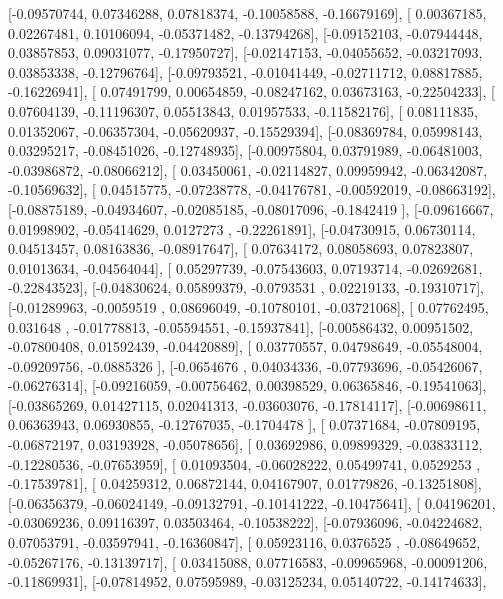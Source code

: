 \documentclass{article}
\begin{document}
       [-0.09570744,  0.07346288,  0.07818374, -0.10058588, -0.16679169],
       [ 0.00367185,  0.02267481,  0.10106094, -0.05371482, -0.13794268],
       [-0.09152103, -0.07944448,  0.03857853,  0.09031077, -0.17950727],
       [-0.02147153, -0.04055652, -0.03217093,  0.03853338, -0.12796764],
       [-0.09793521, -0.01041449, -0.02711712,  0.08817885, -0.16226941],
       [ 0.07491799,  0.00654859, -0.08247162,  0.03673163, -0.22504233],
       [ 0.07604139, -0.11196307,  0.05513843,  0.01957533, -0.11582176],
       [ 0.08111835,  0.01352067, -0.06357304, -0.05620937, -0.15529394],
       [-0.08369784,  0.05998143,  0.03295217, -0.08451026, -0.12748935],
       [-0.00975804,  0.03791989, -0.06481003, -0.03986872, -0.08066212],
       [ 0.03450061, -0.02114827,  0.09959942, -0.06342087, -0.10569632],
       [ 0.04515775, -0.07238778, -0.04176781, -0.00592019, -0.08663192],
       [-0.08875189, -0.04934607, -0.02085185, -0.08017096, -0.1842419 ],
       [-0.09616667,  0.01998902, -0.05414629,  0.0127273 , -0.22261891],
       [-0.04730915,  0.06730114,  0.04513457,  0.08163836, -0.08917647],
       [ 0.07634172,  0.08058693,  0.07823807,  0.01013634, -0.04564044],
       [ 0.05297739, -0.07543603,  0.07193714, -0.02692681, -0.22843523],
       [-0.04830624,  0.05899379, -0.0793531 ,  0.02219133, -0.19310717],
       [-0.01289963, -0.0059519 ,  0.08696049, -0.10780101, -0.03721068],
       [ 0.07762495,  0.031648  , -0.01778813, -0.05594551, -0.15937841],
       [-0.00586432,  0.00951502, -0.07800408,  0.01592439, -0.04420889],
       [ 0.03770557,  0.04798649, -0.05548004, -0.09209756, -0.0885326 ],
       [-0.0654676 ,  0.04034336, -0.07793696, -0.05426067, -0.06276314],
       [-0.09216059, -0.00756462,  0.00398529,  0.06365846, -0.19541063],
       [-0.03865269,  0.01427115,  0.02041313, -0.03603076, -0.17814117],
       [-0.00698611,  0.06363943,  0.06930855, -0.12767035, -0.1704478 ],
       [ 0.07371684, -0.07809195, -0.06872197,  0.03193928, -0.05078656],
       [ 0.03692986,  0.09899329, -0.03833112, -0.12280536, -0.07653959],
       [ 0.01093504, -0.06028222,  0.05499741,  0.0529253 , -0.17539781],
       [ 0.04259312,  0.06872144,  0.04167907,  0.01779826, -0.13251808],
       [-0.06356379, -0.06024149, -0.09132791, -0.10141222, -0.10475641],
       [ 0.04196201, -0.03069236,  0.09116397,  0.03503464, -0.10538222],
       [-0.07936096, -0.04224682,  0.07053791, -0.03597941, -0.16360847],
       [ 0.05923116,  0.0376525 , -0.08649652, -0.05267176, -0.13139717],
       [ 0.03415088,  0.07716583, -0.09965968, -0.00091206, -0.11869931],
       [-0.07814952,  0.07595989, -0.03125234,  0.05140722, -0.14174633],
\end{document}
